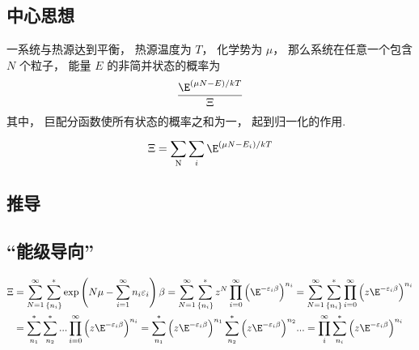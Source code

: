 
\subsection{中心思想}
一系统与热源达到平衡， 热源温度为 $T$，  化学势为 $\mu $，  那么系统在任意一个包含 $N$ 个粒子， 能量 $E$ 的非简并状态的概率为
\begin{equation}
\frac{{{\E^{(\mu N - E)/kT}}}}{\Xi }
\end{equation}
其中， 巨配分函数使所有状态的概率之和为一， 起到归一化的作用.
\begin{equation}
\Xi  = \sum\limits_{\rm{N}}^{} {\sum\limits_i^{} {{\E^{(\mu N - {E_i})/kT}}} } \end{equation}
\subsection{推导} %

\subsection{“能级导向”}

\begin{equation}
\begin{aligned}
\Xi & = \sum\limits_{N = 1}^\infty  {\sum\limits_{\{ {n_i}\} }^ *  {\exp \left( {N\mu  - \sum\limits_{i = 1}^\infty  {{n_i}{\varepsilon _i}} } \right)\beta } }  = \sum\limits_{N = 1}^\infty  {\sum\limits_{\{ {n_i}\} }^ *  {{z^N}\prod\limits_{i = 0}^\infty  {{{\left( {{\E^{ - {\varepsilon _i}\beta }}} \right)}^{{n_i}}}} } }  = \sum\limits_{N = 1}^\infty  {\sum\limits_{\{ {n_i}\} }^ *  {\prod\limits_{i = 0}^\infty  {{{\left( {z{\E^{ - {\varepsilon _i}\beta }}} \right)}^{{n_i}}}} } } \\
 &= \sum\limits_{{n_1}}^ *  {\sum\limits_{{n_2}}^ *  {...\prod\limits_{i = 0}^\infty  {{{\left( {z{\E^{ - {\varepsilon _i}\beta }}} \right)}^{{n_i}}}} } }  = \sum\limits_{{n_1}}^ *  {{{\left( {z{\E^{ - {\varepsilon _i}\beta }}} \right)}^{{n_1}}}} \sum\limits_{{n_2}}^ *  {{{\left( {z{\E^{ - {\varepsilon _i}\beta }}} \right)}^{{n_2}}}} ... = \prod\limits_i^\infty  {\sum\limits_{{n_i}}^ *  {{{\left( {z{\E^{ - {\varepsilon _i}\beta }}} \right)}^{{n_i}}}} }
\end{aligned}
\end{equation}
